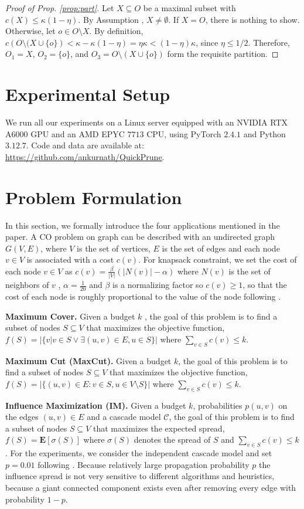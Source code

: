 \begin{proof}[Proof of Prop. \ref{prop:part}] 
  Let $X \subseteq O$ be a maximal subset with $c(X) \le \kappa ( 1 - \eta )$.
  By Assumption \nhi, $X \neq \emptyset$. If $X = O$, there is nothing to show.
  Otherwise, let $o \in O \setminus X$. By definition, $c \left( O \setminus (X \cup \{ o \} \right) < \kappa - \kappa ( 1 - \eta ) = \eta \kappa < (1 - \eta) \kappa$, since $\eta \le 1/2$. Therefore, $O_1 = X$, $O_2 = \{ o \}$, and $O_3 = O \setminus (X \cup \{ o \} )$
  form the requisite partition. 
\end{proof}
\section{Experimental Setup} We run all our experiments on a Linux server equipped with an NVIDIA RTX A6000 GPU and an AMD EPYC $7713$ CPU, using PyTorch $2.4.1$ and Python $3.12.7$. Code and data are available at: \url{https://github.com/ankurnath/QuickPrune}.

\section{Problem Formulation}\label{appendix:problem_formulation}
In this section, we formally introduce the four applications mentioned in the paper. A CO problem on graph can be described with an undirected graph $G (V, E)$, where $V$ is the set of vertices, $E$ is the set of edges and each node $v \in V$ is associated with a cost $c(v)$. For knapsack constraint, we set the cost of each node $v \in V$ as $c(v) = \frac{\beta}{|V|} (|N(v)| - \alpha) $ where $N(v)$ is the set of neighbors of $v$ , $\alpha = \frac{1}{20}$ and $\beta$ is a normalizing factor so $c(v) \geq 1$,  so that the cost of each node is roughly proportional to the value of the node following \citet{yaroslavtsev2020bring}.

\textbf{Maximum Cover.} Given a budget $k$ , the goal of this problem is to find a subset of nodes $S \subseteq V$ that maximizes the objective function, $f(S)= |\{v |  v \in S \lor \exists(u,v) \in E , u \in S  \}|$ where $ \sum_{v \in S} c(v) \leq k$.

\textbf{Maximum Cut (MaxCut).} Given a budget $k$, the goal of this problem is to find a subset of nodes $S \subseteq V$ that maximizes the objective function, $f(S)= |\{ (u,v) \in E: v \in S, u \in V \setminus S \}|$ where $ \sum_{v \in S} c(v) \leq k$.

\textbf{Influence Maximization (IM).} Given a budget $k$, probabilities $p(u,v)$ on the edges $(u,v)\in E$ and a cascade model $\mathcal{C}$, the goal of this problem is to find a subset of nodes $S \subseteq V$ that maximizes the expected spread, $f(S)= \mathbf{E}[\sigma(S)]$ where $\sigma(S)$ denotes the spread of $S$ and $ \sum_{v \in S} c(v) \leq k$.  For the experiments, we consider the independent cascade model \citep{kempe2003maximizing} and set $p = 0.01$ following \citet{chen2009efficient}. Because relatively large propagation probability $p$ the influence spread is not very sensitive to different algorithms and heuristics, because a giant connected component exists even after removing every edge with probability $1-p$.

